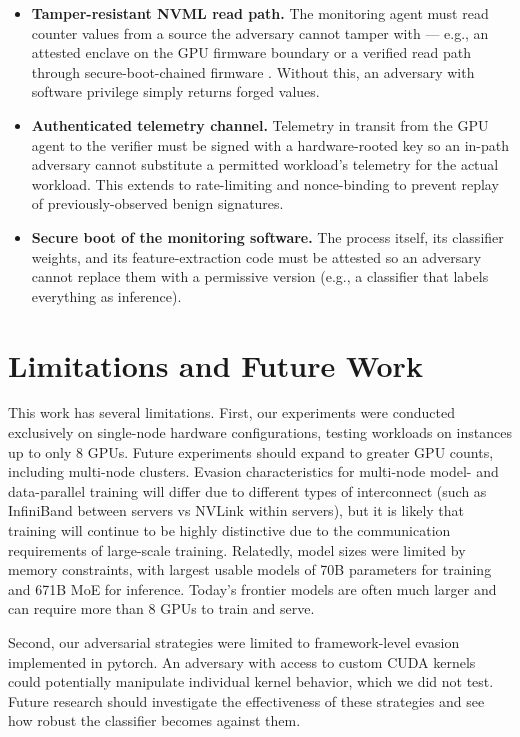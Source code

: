 \begin{itemize}\itemsep2pt
  \item \textbf{Tamper-resistant NVML read path.} The monitoring agent must read counter values from a source the adversary cannot tamper with --- e.g., an attested enclave on the GPU firmware boundary \citep{aarne2025} or a verified read path through secure-boot-chained firmware \citep{petriesolo2025,ogara2025}. Without this, an adversary with software privilege simply returns forged values.
  \item \textbf{Authenticated telemetry channel.} Telemetry in transit from the GPU agent to the verifier must be signed with a hardware-rooted key so an in-path adversary cannot substitute a permitted workload's telemetry for the actual workload. This extends to rate-limiting and nonce-binding to prevent replay of previously-observed benign signatures.
  \item \textbf{Secure boot of the monitoring software.} The process itself, its classifier weights, and its feature-extraction code must be attested so an adversary cannot replace them with a permissive version (e.g., a classifier that labels everything as inference).
\end{itemize}

\FloatBarrier
\section{Limitations and Future Work}
\label{sec:limits}

This work has several limitations. First, our experiments were conducted exclusively on single-node hardware configurations, testing workloads on instances up to only 8 GPUs. Future experiments should expand to greater GPU counts, including multi-node clusters. Evasion characteristics for multi-node model- and data-parallel training will differ due to different types of interconnect (such as InfiniBand between servers vs NVLink within servers), but it is likely that training will continue to be highly distinctive due to the communication requirements of large-scale training. Relatedly, model sizes were limited by memory constraints, with largest usable models of 70B parameters for training and 671B MoE for inference. Today's frontier models are often much larger and can require more than 8 GPUs to train and serve.

Second, our adversarial strategies were limited to framework-level evasion implemented in pytorch. An adversary with access to custom CUDA kernels could potentially manipulate individual kernel behavior, which we did not test. Future research should investigate the effectiveness of these strategies and see how robust the classifier becomes against them.

